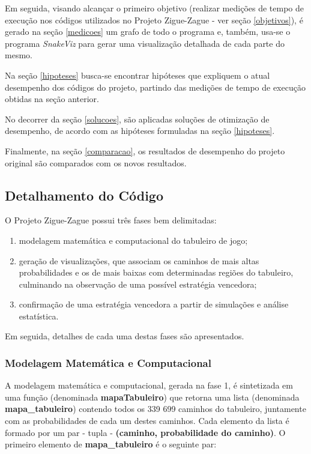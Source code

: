 \documentclass[12pt]{article}
\begin{document}
Em seguida, visando alcançar o primeiro objetivo (realizar medições de tempo de execução nos códigos utilizados no Projeto Zigue-Zague - ver seção \ref{objetivos}), é gerado na seção \ref{medicoes} um grafo de todo o programa e, também, usa-se o programa \textit{SnakeViz} para gerar uma visualização detalhada de cada parte do mesmo.

Na seção \ref{hipoteses} busca-se encontrar hipóteses que expliquem o atual desempenho dos códigos do projeto, partindo das medições de tempo de execução obtidas na seção anterior.

No decorrer da seção \ref{solucoes}, são aplicadas soluções de otimização de desempenho, de acordo com as hipóteses formuladas na seção \ref{hipoteses}.

Finalmente, na seção \ref{comparacao}, os resultados de desempenho do projeto original são comparados com os novos resultados.

\subsection{Detalhamento do Código}
\label{detalhamento}

O Projeto Zigue-Zague possui três fases bem delimitadas: 

\begin{enumerate}
	\item modelagem matemática e computacional do tabuleiro de jogo; 
	\item geração de visualizações, que associam os caminhos de mais altas probabilidades e os de mais baixas com determinadas regiões do tabuleiro, culminando na observação de uma possível estratégia vencedora; 
	\item confirmação de uma estratégia vencedora a partir de simulações e análise estatística.
\end{enumerate} 

Em seguida, detalhes de cada uma destas fases são apresentados.

\subsubsection{Modelagem Matemática e Computacional}
\label{modelagem}

A modelagem matemática e computacional, gerada na fase 1, é sintetizada em uma função (denominada \textbf{mapaTabuleiro}) que retorna uma lista (denominada \textbf{mapa\_tabuleiro}) contendo todos os 339 699 caminhos do tabuleiro, juntamente com as probabilidades de cada um destes caminhos. Cada elemento da lista é formado por um par - tupla - \textbf{(caminho, probabilidade do caminho)}. O primeiro elemento de \textbf{mapa\_tabuleiro} é o seguinte par:
\end{document}
